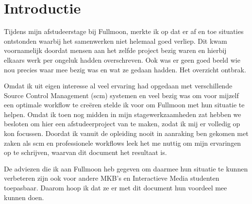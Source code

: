 \setcounter{chapter}{0}
\chapter{Introductie}
  
Tijdens mijn afstudeerstage bij Fullmoon, merkte ik op dat er af en toe situaties ontstonden waarbij het samenwerken niet helemaal goed verliep. Dit kwam voornamelijk doordat mensen aan het zelfde project bezig waren en hierbij elkaars werk per ongeluk hadden overschreven. Ook was er geen goed beeld wie nou precies waar mee bezig was en wat ze gedaan hadden. Het overzicht ontbrak.
  
Omdat ik uit eigen interesse al veel ervaring had opgedaan met verschillende Source Control Management ({\sc scm}) systemen en veel bezig was om voor mijzelf een optimale workflow te creëren stelde ik voor om Fullmoon met hun situatie te helpen. Omdat ik toen nog midden in mijn stagewerkzaamheden zat hebben we besloten om hier een afstudeerproject van te maken, zodat ik mij er volledig op kon focussen. Doordat ik vanuit de opleiding nooit in aanraking ben gekomen met zaken als {\sc scm} en professionele workflows leek het me nuttig om mijn ervaringen op te schrijven, waarvan dit document het resultaat is.

De adviezen die ik aan Fullmoon heb gegeven om daarmee hun situatie te kunnen verbeteren zijn ook voor andere MKB's en Interactieve Media studenten toepasbaar. Daarom hoop ik dat ze er met dit document hun voordeel mee kunnen doen.
